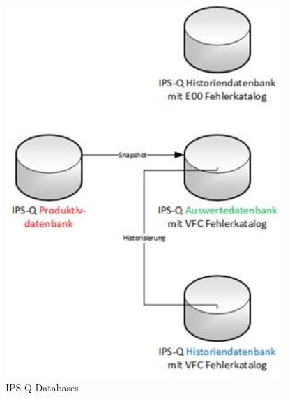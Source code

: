 \begin{figure}[!ht]
	\centering
		\includegraphics[width=300pt, height=400pt, width=1.0\textwidth]{images/3_2_IPSQ.jpg}
	\caption[IPS-Q Databases]{IPS-Q Databases\footnotemark} 
	\label{fig:IPS-Q Databases}

\end{figure}
